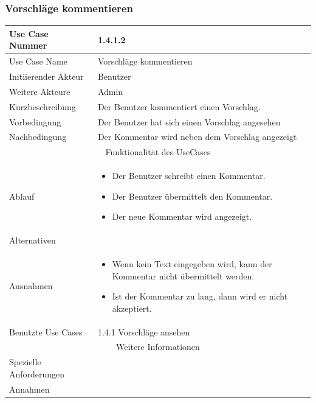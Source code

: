 \documentclass[10pt,a4paper]{article}
\begin{document}
	\subsubsection{Vorschl\"age kommentieren}
	\begin{tabular}{|l|p{.5\linewidth}|}
		\hline Use Case Nummer & 1.4.1.2 \\ 
		\hline Use Case Name & Vorschl\"age kommentieren \\ 
		\hline Initiierender Akteur & Benutzer \\
		\hline Weitere Akteure & Admin \\
		\hline Kurzbeschreibung & Der Benutzer kommentiert einen Vorschlag. \\
		\hline Vorbedingung & Der Benutzer hat sich einen Vorschlag angesehen \\
		\hline Nachbedingung & Der Kommentar wird neben dem Vorschlag angezeigt \\
		\hline \multicolumn{2}{|c|}{Funktionalität des UseCases}\\
		\hline Ablauf & \begin{itemize}
			\item Der Benutzer schreibt einen Kommentar.
			\item Der Benutzer \"ubermittelt den Kommentar.
			\item Der neue Kommentar wird angezeigt.
		\end{itemize} \\ 
		\hline Alternativen &  \\
		\hline Ausnahmen & \begin{itemize}
			\item Wenn kein Text eingegeben wird, kann der Kommentar nicht \"ubermittelt werden.
			\item Ist der Kommentar zu lang, dann wird er nicht akzeptiert.
		\end{itemize} \\
		\hline Benutzte Use Cases & 1.4.1 Vorschl\"age ansehen\\
		\hline \multicolumn{2}{|c|}{Weitere Informationen} \\
		\hline Spezielle Anforderungen &  \\
		\hline Annahmen &  \\
		\hline
	\end{tabular}
	
\end{document}
